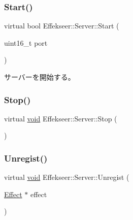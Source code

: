 \subsubsection{\texorpdfstring{Start()}{Start()}}
{\footnotesize\ttfamily virtual bool Effekseer\+::\+Server\+::\+Start (\begin{DoxyParamCaption}\item[{uint16\+\_\+t}]{port }\end{DoxyParamCaption})\hspace{0.3cm}{\ttfamily [pure virtual]}}



サーバーを開始する。 

\mbox{\label{class_effekseer_1_1_server_ac41b09333e7d792489cbeef127df89f6}} 
\subsubsection{\texorpdfstring{Stop()}{Stop()}}
{\footnotesize\ttfamily virtual \mbox{\hyperlink{namespace_effekseer_ab34c4088e512200cf4c2716f168deb56}{void}} Effekseer\+::\+Server\+::\+Stop (\begin{DoxyParamCaption}{ }\end{DoxyParamCaption})\hspace{0.3cm}{\ttfamily [pure virtual]}}

\mbox{\label{class_effekseer_1_1_server_a81f7cfeac861a665a6d2905400735740}} 
\subsubsection{\texorpdfstring{Unregist()}{Unregist()}}
{\footnotesize\ttfamily virtual \mbox{\hyperlink{namespace_effekseer_ab34c4088e512200cf4c2716f168deb56}{void}} Effekseer\+::\+Server\+::\+Unregist (\begin{DoxyParamCaption}\item[{\mbox{\hyperlink{class_effekseer_1_1_effect}{Effect}} $\ast$}]{effect }\end{DoxyParamCaption})\hspace{0.3cm}{\ttfamily [pure virtual]}}




